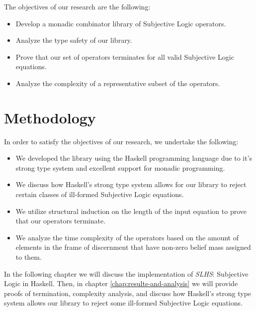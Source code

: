 \documentclass[thesis.tex]{subfiles}
\begin{document}
The objectives of our research are the following:

\begin{itemize}
  \item Develop a monadic combinator library of Subjective Logic operators.
  \item Analyze the type safety of our library. %
  \item Prove that our set of operators terminates for all valid Subjective Logic equations.
  \item Analyze the complexity of a representative subset of the operators.
\end{itemize}




\section{Methodology}

In order to satisfy the objectives of our research, we undertake the following:

\begin{itemize}
  \item We developed the library using the Haskell programming language due to it's strong type
system and excellent support for monadic programming.
  \item We discuss how Haskell's strong type system allows for our library to reject certain
classes of ill-formed Subjective Logic equations.
  \item We utilize structural induction on the length of the input equation to prove that
our operators terminate.
  \item We analyze the time complexity of the operators based on the amount of elements in the
frame of discernment that have non-zero belief mass assigned to them.
\end{itemize}

In the following chapter we will discuss the implementation of \emph{SLHS}: Subjective Logic in Haskell.
Then, in chapter \ref{chap:results-and-analysis} we will provide proofs of termination, complexity
analysis, and discuss how Haskell's strong type system allows our library to reject some ill-formed
Subjective Logic equations.
\end{document}
